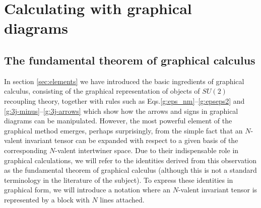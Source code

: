 \documentclass[graybox, secnum]{svmult}
\makeatletter
\newcommand{\Eqs}[1]{Eqs.\@\xspace\eqref{#1}}
\newcommand{\idx}[1]{#1}
\makeatother
\begin{document}
\section{Calculating with graphical diagrams}
\label{sec:calculating}

\subsection{The fundamental theorem of graphical calculus}

In section \ref{sec:elements} we have introduced the basic ingredients of graphical calculus, consisting of the graphical representation of objects of $SU(2)$ recoupling theory, together with rules such as \Eqs{g:eps_nm}--\eqref{g:epseps2} and \eqref{g:3j-minus}--\eqref{g:3j-arrows} which show how the arrows and signs in graphical diagrams can be manipulated. However, the most powerful element of the graphical method emerges, perhaps surprisingly, from the simple fact that an $N$-valent invariant tensor can be expanded with respect to a given basis of the corresponding $N$-valent intertwiner space. Due to their indispensable role in graphical calculations, we will refer to the identities derived from this observation as the \idx{fundamental theorem of graphical calculus} (although this is not a standard terminology in the literature of the subject). To express these identities in graphical form, we will introduce a notation where an $N$-valent invariant tensor is represented by a block with $N$ lines attached.
\end{document}
